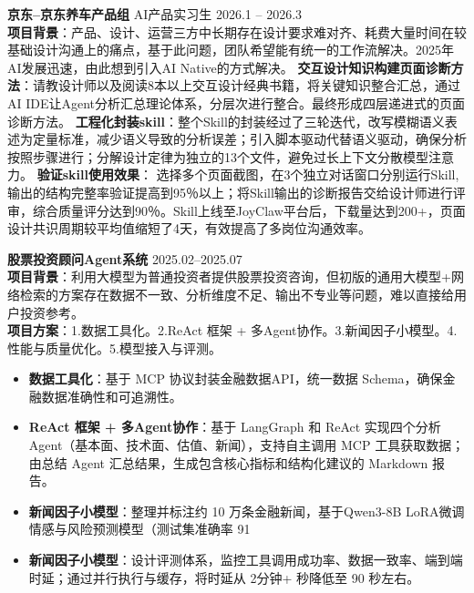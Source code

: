\documentclass[11pt]{article}
\newlength{\interProjectSpacing}
\newcommand{\projectsep}{\vspace{\interProjectSpacing}}
\newlength{\intraProjectTitleSep}
\newcommand{\titlebreak}{\\[\intraProjectTitleSep]}
\newlength{\intraProjectListTopSep}
\begin{document}
\projectsep


\textbf{京东--京东养车产品组}  AI产品实习生  \hfill2026.1 -- 2026.3 \titlebreak
\textbf{项目背景}：产品、设计、运营三方中长期存在设计要求难对齐、耗费大量时间在较基础设计沟通上的痛点，基于此问题，团队希望能有统一的工作流解决。2025年AI发展迅速，由此想到引入AI Native的方式解决。
\textbf{ 交互设计知识构建页面诊断方法}：请教设计师以及阅读8本以上交互设计经典书籍，将关键知识整合汇总，通过AI IDE让Agent分析汇总理论体系，分层次进行整合。最终形成四层递进式的页面诊断方法。
\textbf{ 工程化封装skill}：整个Skill的封装经过了三轮迭代，改写模糊语义表述为定量标准，减少语义导致的分析误差；引入脚本驱动代替语义驱动，确保分析按照步骤进行；分解设计定律为独立的13个文件，避免过长上下文分散模型注意力。
\textbf{ 验证skill使用效果}： 选择多个页面截图，在3个独立对话窗口分别运行Skill,输出的结构完整率验证提高到95％以上；将Skill输出的诊断报告交给设计师进行评审，综合质量评分达到90％。Skill上线至JoyClaw平台后，下载量达到200+，页面设计共识周期较平均值缩短了4天，有效提高了多岗位沟通效率。

\projectsep


\textbf{股票投资顾问Agent系统} \hfill  2025.02--2025.07  \titlebreak
\textbf{项目背景}：利用大模型为普通投资者提供股票投资咨询，但初版的通用大模型+网络检索的方案存在数据不一致、分析维度不足、输出不专业等问题，难以直接给用户投资参考。\titlebreak
\textbf{项目方案}：1.数据工具化。2.ReAct 框架 + 多Agent协作。3.新闻因子小模型。4.性能与质量优化。5.模型接入与评测。

\begin{itemize}[nosep, topsep=\intraProjectListTopSep]
    \item \textbf{数据工具化}：基于 MCP 协议封装金融数据API，统一数据 Schema，确保金融数据准确性和可追溯性。
    \item \textbf{ReAct 框架 + 多Agent协作}：基于 LangGraph 和 ReAct 实现四个分析 Agent（基本面、技术面、估值、新闻），支持自主调用 MCP 工具获取数据；由总结 Agent 汇总结果，生成包含核心指标和结构化建议的 Markdown 报告。
    \item \textbf{新闻因子小模型}：整理并标注约 10 万条金融新闻，基于Qwen3-8B LoRA微调情感与风险预测模型（测试集准确率 91%
    \item \textbf{新闻因子小模型}：设计评测体系，监控工具调用成功率、数据一致率、端到端时延；通过并行执行与缓存，将时延从 2分钟+ 秒降低至 90 秒左右。
\end{itemize}
\end{document}
